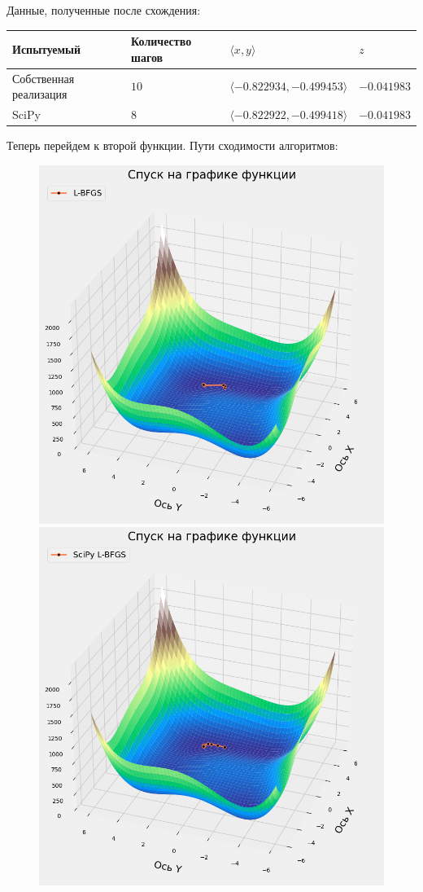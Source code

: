 \documentclass[12pt, a4paper, oneside, final]{article}
\begin{document}
	Данные, полученные после схождения:
	\begin{table}[H]
		\centering
		\begin{tabular}{l|l|l|l}
			Испытуемый & Количество шагов & $\langle x, y \rangle$ & $z$ \\ \hline
			Собственная реализация & $10$ & $\langle -0.822934, -0.499453 \rangle$ & $-0.041983$ \\
			SciPy & $8$ & $\langle -0.822922, -0.499418 \rangle$ & $-0.041983$
		\end{tabular}
	\end{table}
	Теперь перейдем к второй функции.
	Пути сходимости алгоритмов:
	\begin{figure}[H]
		\centering
		\includegraphics[scale = 0.35]{Image/T2A_F2_LBFGS.png}
		\includegraphics[scale = 0.35]{Image/T2A_F2_scipy_LBFGS.png}

\end{figure}
\end{document}
